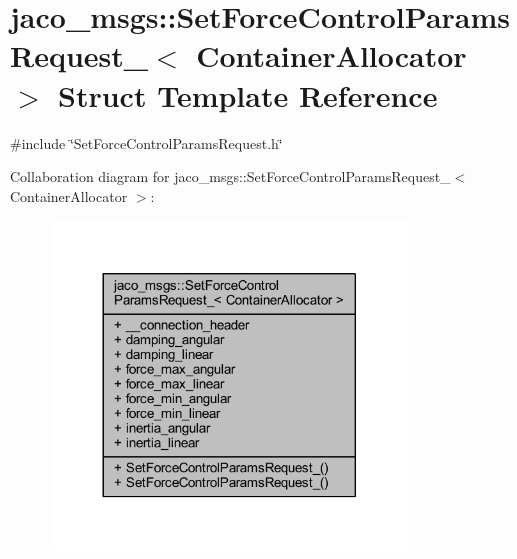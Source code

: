 \hypertarget{structjaco__msgs_1_1SetForceControlParamsRequest__}{}\section{jaco\+\_\+msgs\+:\+:Set\+Force\+Control\+Params\+Request\+\_\+$<$ Container\+Allocator $>$ Struct Template Reference}
\label{structjaco__msgs_1_1SetForceControlParamsRequest__}


{\ttfamily \#include \char`\"{}Set\+Force\+Control\+Params\+Request.\+h\char`\"{}}



Collaboration diagram for jaco\+\_\+msgs\+:\+:Set\+Force\+Control\+Params\+Request\+\_\+$<$ Container\+Allocator $>$\+:
\nopagebreak
\begin{figure}[H]
\begin{center}
\leavevmode
\includegraphics[width=269pt]{df/d37/structjaco__msgs_1_1SetForceControlParamsRequest____coll__graph}
\end{center}
\end{figure}
